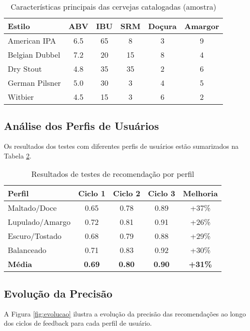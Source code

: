 \documentclass[12pt,a4paper]{article}
\begin{document}
\begin{table}[H]
\centering
\caption{Características principais das cervejas catalogadas (amostra)}
\label{tab:caracteristicas}
\begin{tabular}{|l|c|c|c|c|c|}
\hline
\textbf{Estilo} & \textbf{ABV} & \textbf{IBU} & \textbf{SRM} & \textbf{Doçura} & \textbf{Amargor} \\
\hline
American IPA & 6.5 & 65 & 8 & 3 & 9 \\
Belgian Dubbel & 7.2 & 20 & 15 & 8 & 4 \\
Dry Stout & 4.8 & 35 & 35 & 2 & 6 \\
German Pilsner & 5.0 & 30 & 3 & 4 & 5 \\
Witbier & 4.5 & 15 & 3 & 6 & 2 \\
\hline
\end{tabular}
\end{table}

\subsection{Análise dos Perfis de Usuários}

Os resultados dos testes com diferentes perfis de usuários estão sumarizados na Tabela \ref{tab:resultados}.

\begin{table}[H]
\centering
\caption{Resultados de testes de recomendação por perfil}
\label{tab:resultados}
\begin{tabular}{|l|c|c|c|c|}
\hline
\textbf{Perfil} & \textbf{Ciclo 1} & \textbf{Ciclo 2} & \textbf{Ciclo 3} & \textbf{Melhoria} \\
\hline
Maltado/Doce & 0.65 & 0.78 & 0.89 & +37\% \\
Lupulado/Amargo & 0.72 & 0.81 & 0.91 & +26\% \\
Escuro/Tostado & 0.68 & 0.79 & 0.88 & +29\% \\
Balanceado & 0.71 & 0.83 & 0.92 & +30\% \\
\hline
\textbf{Média} & \textbf{0.69} & \textbf{0.80} & \textbf{0.90} & \textbf{+31\%} \\
\hline
\end{tabular}
\end{table}

\subsection{Evolução da Precisão}

A Figura \ref{fig:evolucao} ilustra a evolução da precisão das recomendações ao longo dos ciclos de feedback para cada perfil de usuário.
\end{document}
